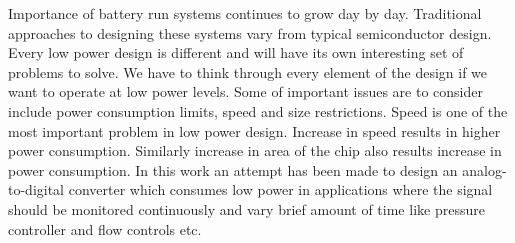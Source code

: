\par
\hspace{0.5cm} Importance of battery run systems continues to grow day by day. Traditional approaches to designing these systems vary from typical semiconductor design. Every low power design is different and will have its own interesting set of problems to solve. We have to think through every element of the design if we want to operate at low power levels. Some of important issues are to consider include power consumption limits, speed and size restrictions. Speed is one of the most important problem in low power design. Increase in speed results in higher power consumption. Similarly increase in area of the chip also results increase in power consumption. In this work an attempt has been made to design an analog-to-digital converter which consumes low power in applications where the signal should be monitored continuously and vary brief amount of time like pressure controller and flow controls etc.
